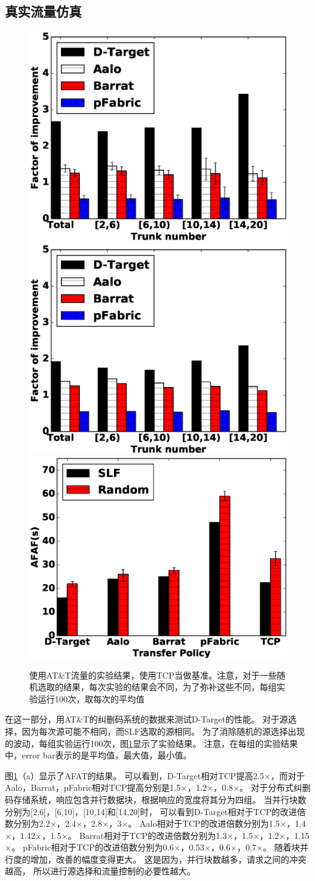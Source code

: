 \subsection{真实流量仿真}
\begin{figure}[h]
\centering
{}
 {\includegraphics[width=0.32\columnwidth]{figures/DTARGET/picture/evaluation/ex1/total.eps}}
{\includegraphics[width=0.32\columnwidth]{figures/DTARGET/picture/evaluation/ex1/random_select.eps}}
{\includegraphics[width=0.32\columnwidth]{figures/DTARGET/picture/evaluation/ex1/diff.eps}}
\caption{使用AT\&T流量的实验结果，使用TCP当做基准。注意，对于一些随机选取的结果，每次实验的结果会不同，为了弥补这些不同，每组实验运行100次，取每次的平均值}
\label{trace_fig}
\end{figure}


在这一部分，用AT\&T的纠删码系统的数据来测试D-Target的性能。
对于源选择，因为每次源可能不相同，而SLF选取的源相同。
为了消除随机的源选择出现的波动，每组实验运行100次，图\ref{trace_fig}显示了实验结果。
注意，在每组的实验结果中，error bar表示的是平均值，最大值，最小值。


图\ref{trace_fig}（a）显示了AFAT的结果。
可以看到，D-Target相对TCP提高2.5$\times$，而对于Aalo，Barrat，pFabric相对TCP提高分别是1.5$\times$，1.2$\times$，0.8$\times$。
对于分布式纠删码存储系统，响应包含并行数据块，根据响应的宽度将其分为四组。
当并行块数分别为[2,6]，[6,10]，[10,14]和[14,20]时，
可以看到D-Target相对于TCP的改进倍数分别为2.2$\times$，2.4$\times$，2.8$\times$，3$\times$。
Aalo相对于TCP的改进倍数分别为1.5$\times$，1.4$\times$，1.42$\times$，1.5$\times$。
Barrat相对于TCP的改进倍数分别为1.3$\times$，1.5$\times$，1.2$\times$，1.15$\times$。
pFabric相对于TCP的改进倍数分别为0.6$\times$，0.53$\times$，0.6$\times$，0.7$\times$。
随着块并行度的增加，改善的幅度变得更大。
这是因为，并行块数越多，请求之间的冲突越高，
所以进行源选择和流量控制的必要性越大。

